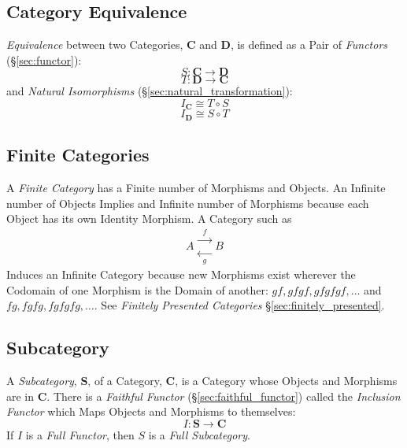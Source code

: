 \subsection{Category Equivalence}\label{sec:category_equivalence}

\emph{Equivalence} between two Categories, $\mathbf{C}$ and
$\mathbf{D}$, is defined as a Pair of \emph{Functors}
(\S\ref{sec:functor}):
\[
    S : \mathbf{C} \rightarrow \mathbf{D}
\]\[
    T : \mathbf{D} \rightarrow \mathbf{C}
\]
and \emph{Natural Isomorphisms} (\S\ref{sec:natural_transformation}):
\[
    I_\mathbf{C} \cong T \circ S
\]\[
    I_\mathbf{D} \cong S \circ T
\]



\subsection{Finite Categories}\label{sec:finite_categories}

A \emph{Finite Category} has a Finite number of Morphisms and
Objects. An Infinite number of Objects Implies and Infinite number of
Morphisms because each Object has its own Identity Morphism. A
Category such as
\[
    A
    \begin{matrix}
    \xrightarrow{\;\;f\;\;}\\
    \xleftarrow[\;\;g\;\;]{}
    \end{matrix}
    B
\]
Induces an Infinite Category because new Morphisms exist wherever the
Codomain of one Morphism is the Domain of another: $gf, gfgf, gfgfgf,
\ldots$ and $fg, fgfg, fgfgfg, \ldots$. See \emph{Finitely Presented
  Categories} \S\ref{sec:finitely_presented}.



\subsection{Subcategory}\label{sec:subcategory}

A \emph{Subcategory}, $\mathbf{S}$, of a Category, $\mathbf{C}$, is a
Category whose Objects and Morphisms are in $\mathbf{C}$. There is a
\emph{Faithful Functor} (\S\ref{sec:faithful_functor}) called the
\emph{Inclusion Functor} which Maps Objects and Morphisms to
themselves:
\[
    I : \mathbf{S} \rightarrow \mathbf{C}
\]
If $I$ is a \emph{Full Functor}, then $S$ is a \emph{Full
  Subcategory}.



